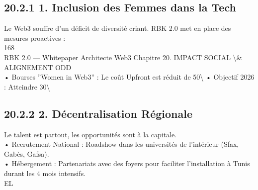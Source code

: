 \documentclass[12pt,landscape,a4paper]{article}
\begin{document}
\subsection{20.2.1 1. Inclusion des Femmes dans la Tech}
Le Web3 souffre d’un déficit de diversité criant. RBK 2.0 met en place des mesures proactives :\\
\vspace{0.5em}
\vspace{0.5em}
168\\
RBK 2.0 — Whitepaper Architecte Web3                                                     Chapitre 20. IMPACT SOCIAL \textbackslash{}& ALIGNEMENT ODD\\
\vspace{0.5em}
\vspace{0.5em}
• Bourses ”Women in Web3” : Le coût Upfront est réduit de 50\textbackslash{}%
\vspace{0.5em}
• Objectif 2026 : Atteindre 30\textbackslash{}%
\vspace{0.5em}
\vspace{0.5em}
\subsection{20.2.2 2. Décentralisation Régionale}
Le talent est partout, les opportunités sont à la capitale.\\
\vspace{0.5em}
• Recrutement National : Roadshow dans les universités de l’intérieur (Sfax, Gabès, Gafsa).\\
\vspace{0.5em}
• Hébergement : Partenariats avec des foyers pour faciliter l’installation à Tunis durant les 4 mois intensifs.\\
\vspace{0.5em}
\vspace{0.5em}
\vspace{0.5em}
\vspace{0.5em}
EL\\
\end{document}

